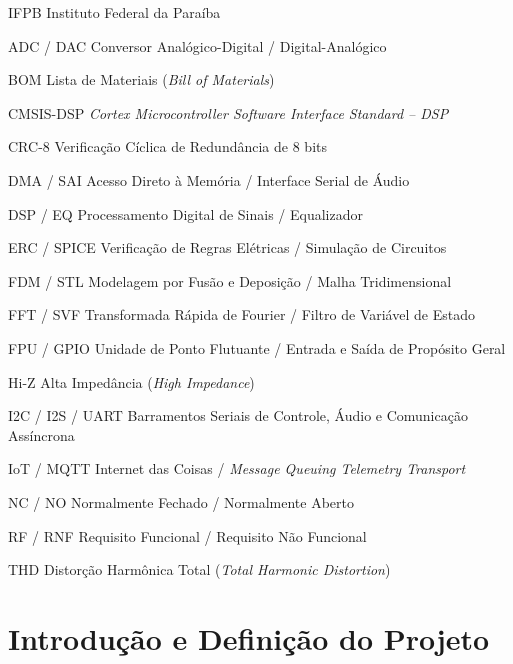 \documentclass[12pt,openright,oneside,a4paper,brazil]{abntex2}
\begin{document}
\begin{siglas}
  \item[IFPB] Instituto Federal da Paraíba
  \item[ADC / DAC] Conversor Analógico-Digital / Digital-Analógico
  \item[BOM] Lista de Materiais (\textit{Bill of Materials})
  \item[CMSIS-DSP] \textit{Cortex Microcontroller Software Interface Standard -- DSP}
  \item[CRC-8] Verificação Cíclica de Redundância de 8 bits
  \item[DMA / SAI] Acesso Direto à Memória / Interface Serial de Áudio
  \item[DSP / EQ] Processamento Digital de Sinais / Equalizador
  \item[ERC / SPICE] Verificação de Regras Elétricas / Simulação de Circuitos
  \item[FDM / STL] Modelagem por Fusão e Deposição / Malha Tridimensional
  \item[FFT / SVF] Transformada Rápida de Fourier / Filtro de Variável de Estado
  \item[FPU / GPIO] Unidade de Ponto Flutuante / Entrada e Saída de Propósito Geral
  \item[Hi-Z] Alta Impedância (\textit{High Impedance})
  \item[I2C / I2S / UART] Barramentos Seriais de Controle, Áudio e Comunicação Assíncrona
  \item[IoT / MQTT] Internet das Coisas / \textit{Message Queuing Telemetry Transport}
  \item[NC / NO] Normalmente Fechado / Normalmente Aberto
  \item[RF / RNF] Requisito Funcional / Requisito Não Funcional
  \item[THD] Distorção Harmônica Total (\textit{Total Harmonic Distortion})
\end{siglas}

\tableofcontents*
\cleardoublepage

\textual

\chapter{Introdução e Definição do Projeto}
\end{document}
